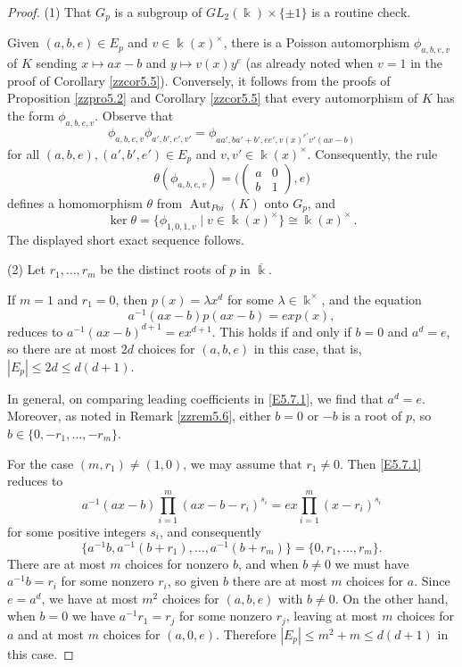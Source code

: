 \documentclass[12pt]{amsart}
\theoremstyle{plain}
\numberwithin{theorem}{section}
\numberwithin{equation}{theorem}
\theoremstyle{definition}
\DeclareMathOperator{\Aut}{Aut}
\newcommand \kx {\Bbbk^\times}
\newcommand \kbar {\overline{\Bbbk}}
\begin{document}
\begin{proof}
(1) That $G_p$ is a subgroup of $GL_2(\Bbbk) \times \{\pm1\}$ is a routine check.

Given $(a,b,e) \in E_p$ and $v \in \Bbbk(x)^\times$, there is a Poisson automorphism $\phi_{a,b,e,v}$ of $K$ sending $x \mapsto ax-b$ and $y \mapsto v(x) y^e$ (as already noted when $v=1$ in the proof of Corollary \ref{zzcor5.5}).  Conversely, it follows from the proofs of Proposition \ref{zzpro5.2} and Corollary \ref{zzcor5.5} that every automorphism of $K$ has the form $\phi_{a,b,e,v}$.  Observe that
$$
\phi_{a,b,e,v} \phi_{a',b',e',v'} = \phi_{aa', ba'+b', ee', v(x)^{e'} v'(ax-b)}
$$
for all $(a,b,e), (a',b',e') \in E_p$ and $v,v' \in \Bbbk(x)^\times$.  Consequently, the rule
$$
\theta(\phi_{a,b,e,v}) = \biggl( \begin{pmatrix} a&0\\ b&1 \end{pmatrix}, e \biggr)
$$
defines a homomorphism $\theta$ from $\Aut_{Poi}(K)$ onto $G_p$, and
$$
\ker \theta = \{ \phi_{1,0,1,v} \mid v \in \Bbbk(x)^\times \} \cong \Bbbk(x)^\times \,.
$$
The displayed short exact sequence follows.

(2) Let $r_1,\dots,r_m$ be the distinct roots of $p$ in $\kbar$.

If $m=1$ and $r_1=0$, then $p(x) = \lambda x^d$ for some $\lambda \in \kx$, and the equation
\begin{equation}  \label{E5.7.1}  \tag{E5.7.1}
a^{-1} (ax-b) p(ax-b) = e x p(x),
\end{equation}
reduces to $a^{-1}(ax-b)^{d+1} = ex^{d+1}$.  This holds if and only if $b=0$ and $a^d=e$, so there are at most $2d$ choices for $(a,b,e)$ in this case, that is, $|E_p| \le 2d \le d(d+1)$.

In general, on comparing leading coefficients in \eqref{E5.7.1}, we find that $a^d = e$.  Moreover, as noted in Remark \ref{zzrem5.6}, either $b=0$ or $-b$ is a root of $p$, so $b \in \{0,-r_1,\dots,-r_m\}$.

For the case $(m,r_1) \ne (1,0)$, we may assume that $r_1 \ne 0$.  Then \eqref{E5.7.1} reduces to
$$
a^{-1} (ax-b) \prod_{i=1}^m (ax-b-r_i)^{s_i} = e x \prod_{i=1}^m (x-r_i)^{s_i}
$$
for some positive integers $s_i$, and consequently
$$
\{ a^{-1}b, a^{-1}(b+r_1), \dots, a^{-1}(b+r_m) \} = \{0,r_1,\dots,r_m\}.
$$
There are at most $m$ choices for nonzero $b$, and when $b \ne 0$ we must have $a^{-1}b = r_i$ for some nonzero $r_i$, so given $b$ there are at most $m$ choices for $a$.  Since $e = a^d$, we have at most $m^2$ choices for $(a,b,e)$ with $b \ne 0$.  On the other hand, when $b=0$ we have $a^{-1}r_1 = r_j$ for some nonzero $r_j$, leaving at most $m$ choices for $a$ and at most $m$ choices for $(a,0,e)$.  Therefore $|E_p| \le m^2+m \le d(d+1)$ in this case.


\end{proof}
\end{document}
